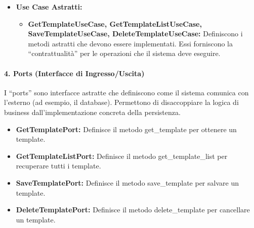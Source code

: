     \begin{itemize}
        \item \textbf{Use Case Astratti:}
        \begin{itemize}
            \item \textbf{GetTemplateUseCase, GetTemplateListUseCase, SaveTemplateUseCase, DeleteTemplateUseCase:} Definiscono i metodi astratti che devono essere implementati. Essi forniscono la “contrattualità” per le operazioni che il sistema deve eseguire.
        \end{itemize}
    \end{itemize}
    
    \paragraph{4. Ports (Interfacce di Ingresso/Uscita)}
    I “ports” sono interfacce astratte che definiscono come il sistema comunica con l’esterno (ad esempio, il database). Permettono di disaccoppiare la logica di business dall’implementazione concreta della persistenza.
    
    \begin{itemize}
        \item \textbf{GetTemplatePort:} Definisce il metodo get\_template per ottenere un template.
        \item \textbf{GetTemplateListPort:} Definisce il metodo get\_template\_list per recuperare tutti i template.
        \item \textbf{SaveTemplatePort:} Definisce il metodo save\_template per salvare un template.
        \item \textbf{DeleteTemplatePort:} Definisce il metodo delete\_template per cancellare un template.
    \end{itemize}
    
